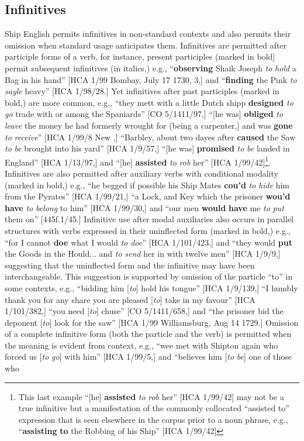 \subsection{\textbf{Infinitives}}%

Ship English permits infinitives in non-standard contexts and also permits their omission when standard usage anticipates them. Infinitives are permitted after participle forms of a verb, for instance, present participles (marked in bold] permit subsequent infinitives (in italics,) e.g., “\textbf{observing} Shaik Joseph \textit{to} \textit{hold} a Bag in his hand” [HCA 1/99 Bombay, July 17 1730, 3,] and “\textbf{finding} the Pink \textit{to} \textit{sayle} heavy” [HCA 1/98/28.] Yet infinitives after past participles (marked in bold,) are more common, e.g., “they mett with a little Dutch shipp \textbf{designed} \textit{to} \textit{go} trade with or among the Spaniards” [CO 5/1411/97,] “[he was] \textbf{obliged} \textit{to} \textit{leave} the money he had formerly wrought for (being a carpenter,] and was \textbf{gone} \textit{to} \textit{receive}” [HCA 1/99/8 New \citealt{Providence1722},] “Barbley, about two dayes after \textbf{caused} the Saw \textit{to} \textit{be} brought into his yard” [HCA 1/9/57,] “[he was] \textbf{promised} \textit{to} \textit{be} landed in England” [HCA 1/13/97,] and “[he] \textbf{assisted} \textit{to} \textit{rob} her” [HCA 1/99/42]\footnote{This last example “[he] \textbf{assisted} \textit{to} \textit{rob} her” [HCA 1/99/42] may not be a true infinitive but a manifestation of the commonly collocated “assisted to” expression that is seen elsewhere in the corpus prior to a noun phrase, e.g., “\textbf{assisting} \textbf{to} the Robbing of his Ship” [HCA 1/99/42]}. Infinitives are also permitted after auxiliary verbs with conditional modality (marked in bold,) e.g., “he begged if possible his Ship Mates \textbf{cou’d} \textit{to} \textit{hide} him from the Pyrates” [HCA 1/99/21,] “a Lock, and Key which the prisoner \textbf{wou’d} \textbf{have} \textit{to} \textit{belong} to him” [HCA 1/99/30,] and “our men \textbf{would} \textbf{have} me \textit{to} \textit{put} them on” [445f.1/45.] Infinitive use after modal auxiliaries also occurs in parallel structures with verbs expressed in their uninflected form (marked in bold,) e.g., “for I cannot \textbf{doe} what I would \textit{to} \textit{doe}” [HCA 1/101/423,] and “they would \textbf{put} the Goods in the Hould... and \textit{to} \textit{send} her in with twelve men” [HCA 1/9/9,] suggesting that the uninflected form and the infinitive may have been interchangeable. This suggestion is supported by omission of the particle “to” in some contexts, e.g., “bidding him [\textit{to}] hold his tongue” [HCA 1/9/139,] “I humbly thank you for any share you are pleased [\textit{to}] take in my favour” [HCA 1/101/382,] “you need [\textit{to}] chuse” [CO 5/1411/658,] and “the prisoner bid the deponent [\textit{to}] look for the saw” [HCA 1/99 Williamsburg, Aug 14 1729.] Omission of a complete infinitive form (both the particle and the verb) is permitted when the meaning is evident from context, e.g., “wee met with Shipton again who forced us [\textit{to} \textit{go}] with him” [HCA 1/99/5,] and “believes him [\textit{to} \textit{be}] one of those who 